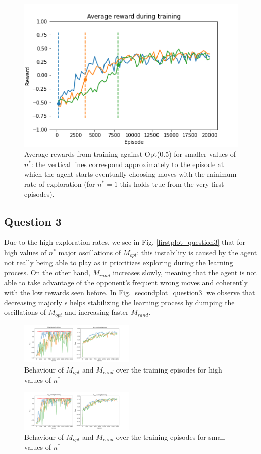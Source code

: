 \documentclass[10pt]{IEEEtran}
\begin{document}
\begin{figure}[H]
    \centering
    \includegraphics[scale=0.4]{code/figures/rewards_n_star_second.png}
    \caption{Average rewards from training against Opt(0.5) for smaller values of $n^{*}$: the vertical lines correspond approximately to the episode at which the agent starts eventually choosing moves with the minimum rate of exploration (for $n^{*} = 1$ this holds true from the very first episodes).}
    \label{secondplot_question2}
\end{figure}
\subsection*{Question 3}
Due to the high exploration rates, we see in Fig. \eqref{firstplot_question3} that for high values of $n^{*}$ major oscillations of $M_{opt}$: this instability is caused by the agent not really being able to play as it prioritizes exploring during the learning process. On the other hand, $M_{rand}$ increases slowly, meaning that the agent is not able to take advantage of the opponent's frequent wrong moves and coherently with the low rewards seen before. In Fig. \eqref{secondplot_question3} we observe that decreasing majorly $\epsilon$ helps stabilizing the learning process by dumping the oscillations of $M_{opt}$ and increasing faster $M_{rand}$.
\begin{figure}[H]
    \centering
    \includegraphics[width=0.49\textwidth]{code/figures/performance_n_star_first.png}
    \caption{Behaviour of $M_{opt}$ and $M_{rand}$ over the training episodes for high values of $n^{*}$}
    \label{firstplot_question3}
\end{figure}
\begin{figure}[H]
    \centering
    \includegraphics[width=0.49\textwidth]{code/figures/performance_n_star_second.png}
    \caption{Behaviour of $M_{opt}$ and $M_{rand}$ over the training episodes for small values of $n^{*}$}
    \label{secondplot_question3}
\end{figure}
\end{document}
